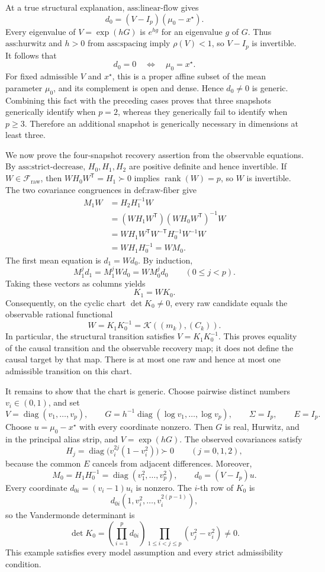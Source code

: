 At a true structural explanation, \(\text{ass:linear-flow}\) gives
\[
 d_0=(V-I_p)(\mu_0-x^\star).
\]
Every eigenvalue of \(V=\exp(hG)\) is \(e^{hg}\) for an eigenvalue \(g\) of \(G\).  Thus \(\text{ass:hurwitz}\) and \(h>0\) from \(\text{ass:spacing}\) imply \(\rho(V)<1\), so \(V-I_p\) is invertible.  It follows that
\[
 d_0=0\quad\Longleftrightarrow\quad\mu_0=x^\star.
\]
For fixed admissible \(V\) and \(x^\star\), this is a proper affine subset of the mean parameter \(\mu_0\), and its complement is open and dense.  Hence \(d_0\ne0\) is generic.  Combining this fact with the preceding cases proves that three snapshots generically identify when \(p=2\), whereas they generically fail to identify when \(p\ge3\).  Therefore an additional snapshot is generically necessary in dimensions at least three.

We now prove the four-snapshot recovery assertion from the observable equations.  By \(\text{ass:strict-decrease}\), \(H_0,H_1,H_2\) are positive definite and hence invertible.  If \(W\in\mathcal F_{\mathrm{raw}}\), then \(WH_0W^{\mathsf T}=H_1\succ0\) implies \(\operatorname{rank}(W)=p\), so \(W\) is invertible.  The two covariance congruences in \(\text{def:raw-fiber}\) give
\[
 \begin{aligned}
 M_1W
 &=H_2H_1^{-1}W\\
 &=(WH_1W^{\mathsf T})(WH_0W^{\mathsf T})^{-1}W\\
 &=WH_1W^{\mathsf T}W^{-\mathsf T}H_0^{-1}W^{-1}W\\
 &=WH_1H_0^{-1}=WM_0.
 \end{aligned}
\]
The first mean equation is \(d_1=Wd_0\).  By induction,
\[
 M_1^jd_1=M_1^jWd_0=WM_0^jd_0
 \qquad(0\le j<p).
\]
Taking these vectors as columns yields
\[
 K_1=WK_0.
\]
Consequently, on the cyclic chart \(\det K_0\ne0\), every raw candidate equals the observable rational functional
\[
 W=K_1K_0^{-1}=\mathcal K((m_k),(C_k)).
\]
In particular, the structural transition satisfies \(V=K_1K_0^{-1}\).  This proves equality of the causal transition and the observable recovery map; it does not define the causal target by that map.  There is at most one raw and hence at most one admissible transition on this chart.

It remains to show that the chart is generic.  Choose pairwise distinct numbers \(v_i\in(0,1)\), and set
\[
 V=\operatorname{diag}(v_1,\ldots,v_p),
 \qquad
 G=h^{-1}\operatorname{diag}(\log v_1,\ldots,\log v_p),
 \qquad
 \Sigma=I_p,
 \qquad E=I_p.
\]
Choose \(u=\mu_0-x^\star\) with every coordinate nonzero.  Then \(G\) is real, Hurwitz, and in the principal alias strip, and \(V=\exp(hG)\).  The observed covariances satisfy
\[
 H_j=\operatorname{diag}\bigl(v_i^{2j}(1-v_i^2)\bigr)\succ0
 \qquad(j=0,1,2),
\]
because the common \(E\) cancels from adjacent differences.  Moreover,
\[
 M_0=H_1H_0^{-1}=\operatorname{diag}(v_1^2,\ldots,v_p^2),
 \qquad d_0=(V-I_p)u.
\]
Every coordinate \(d_{0i}=(v_i-1)u_i\) is nonzero.  The \(i\)-th row of \(K_0\) is
\[
 d_{0i}(1,v_i^2,\ldots,v_i^{2(p-1)}),
\]
so the Vandermonde determinant is
\[
 \det K_0
 =\left(\prod_{i=1}^p d_{0i}\right)
 \prod_{1\le i<j\le p}(v_j^2-v_i^2)\ne0.
\]
This example satisfies every model assumption and every strict admissibility condition.

